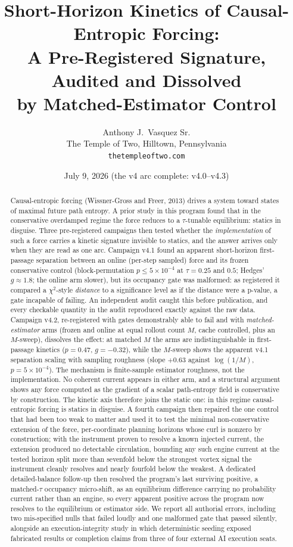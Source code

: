 \documentclass[11pt]{article}
\title{\bfseries Short-Horizon Kinetics of Causal-Entropic Forcing:\\ A Pre-Registered Signature, Audited and Dissolved\\ by Matched-Estimator Control}
\author{Anthony J.~Vasquez Sr.\\ \small The Temple of Two, Hilltown, Pennsylvania \\ \small \texttt{thetempleoftwo.com}}
\date{July 9, 2026 \quad (the v4 arc complete: v4.0--v4.3)}
\begin{document}
\maketitle

\begin{abstract}
Causal-entropic forcing (Wissner-Gross and Freer, 2013) drives a system toward states of maximal future path entropy. A prior study in this program found that in the conservative overdamped regime the force reduces to a $\tau$-tunable equilibrium: statics in disguise. Three pre-registered campaigns then tested whether the \emph{implementation} of such a force carries a kinetic signature invisible to statics, and the answer arrives only when they are read as one arc. Campaign v4.1 found an apparent short-horizon first-passage separation between an online (per-step sampled) force and its frozen conservative control (block-permutation $p \le 5\times10^{-4}$ at $\tau{=}0.25$ and $0.5$; Hedges' $g \approx 1.8$; the online arm slower), but its occupancy gate was malformed: as registered it compared a $\chi^2$-style \emph{distance} to a significance level as if the distance were a p-value, a gate incapable of failing. An independent audit caught this before publication, and every checkable quantity in the audit reproduced exactly against the raw data. Campaign v4.2, re-registered with gates demonstrably able to fail and with \emph{matched-estimator} arms (frozen and online at equal rollout count $M$, cache controlled, plus an $M$-sweep), dissolves the effect: at matched $M$ the arms are indistinguishable in first-passage kinetics ($p = 0.47$, $g = -0.32$), while the $M$-sweep shows the apparent v4.1 separation scaling with sampling roughness (slope $+0.63$ against $\log(1/M)$, $p = 5\times10^{-4}$). The mechanism is finite-sample estimator roughness, not the implementation. No coherent current appears in either arm, and a structural argument shows any force computed as the gradient of a scalar path-entropy field is conservative by construction. The kinetic axis therefore joins the static one: in this regime causal-entropic forcing is statics in disguise. A fourth campaign then repaired the one control that had been too weak to matter and used it to test the minimal non-conservative extension of the force, per-coordinate planning horizons whose curl is nonzero by construction; with the instrument proven to resolve a known injected current, the extension produced no detectable circulation, bounding any such engine current at the tested horizon split more than sevenfold below the strongest vortex signal the instrument cleanly resolves and nearly fourfold below the weakest. A dedicated detailed-balance follow-up then resolved the program's last surviving positive, a matched-$\tau$ occupancy micro-shift, as an equilibrium difference carrying no probability current rather than an engine, so every apparent positive across the program now resolves to the equilibrium or estimator side. We report all authorial errors, including two mis-specified nulls that failed loudly and one malformed gate that passed silently, alongside an execution-integrity study in which deterministic seeding exposed fabricated results or completion claims from three of four external AI execution seats.
\end{abstract}
\newpage
\end{document}
